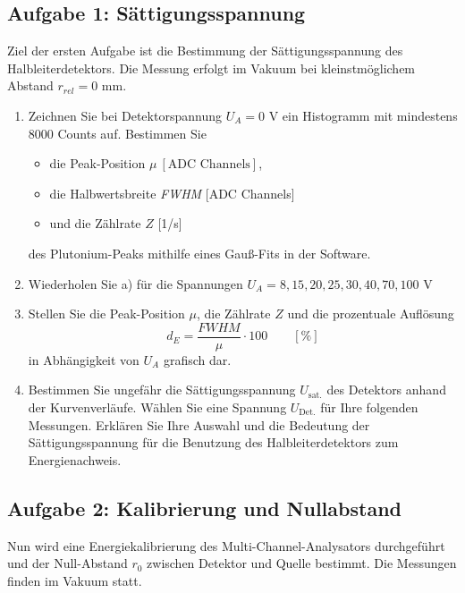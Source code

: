 \subsection{Aufgabe 1: Sättigungsspannung}
Ziel der ersten Aufgabe ist die Bestimmung der Sättigungsspannung des Halbleiterdetektors. Die Messung erfolgt im Vakuum bei kleinstmöglichem Abstand $r_{rel} = 0$ mm.
\begin{enumerate}[label=\textbf{\alph*)}]
	\item Zeichnen Sie bei Detektorspannung $U_A = 0$ V ein Histogramm mit mindestens 8000 Counts auf. Bestimmen Sie 
		\begin{itemize}[nosep]
		\item die Peak-Position $\mu\ [\text{ADC Channels}]$,
		\item die Halbwertsbreite \textit{FWHM} [ADC Channels]
		\item und die Zählrate $Z$ [1/s]
	\end{itemize}
	des Plutonium-Peaks mithilfe eines Gauß-Fits in der Software.
	\item Wiederholen Sie a) für die Spannungen $U_A = 8, 15, 20, 25, 30, 40, 70, 100$ V
	\item Stellen Sie die Peak-Position $\mu$, die Zählrate $Z$ und die prozentuale Auflösung
		\begin{equation}
			d_E = \frac{\textit{FWHM}}{\mu} \cdot 100 \qquad [\%]
		\end{equation}
		in Abhängigkeit von $U_A$ grafisch dar.
	\item Bestimmen Sie ungefähr die Sättigungsspannung $U_{\text{sat.}}$ des Detektors anhand der Kurvenverläufe. Wählen Sie eine Spannung $U_{\text{Det.}}$ für Ihre folgenden Messungen. Erklären Sie Ihre Auswahl und die Bedeutung der Sättigungsspannung für die Benutzung des Halbleiterdetektors zum Energienachweis.
\end{enumerate}

\subsection{Aufgabe 2: Kalibrierung und Nullabstand}
Nun wird eine Energiekalibrierung des Multi-Channel-Analysators durchgeführt und der Null-Abstand $r_0$ zwischen Detektor und Quelle bestimmt. Die Messungen finden im Vakuum statt.


